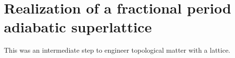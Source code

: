 
\renewcommand{\thechapter}{8}

\chapter{Realization of a fractional period adiabatic superlattice}
\label{ch:raman_lattice}

This was an intermediate step to engineer topological matter with a lattice. 



